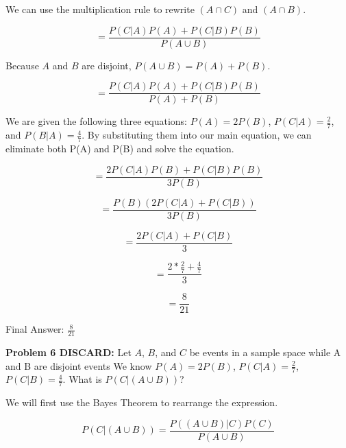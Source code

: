 \documentclass{article}
\begin{document}
 We can use the multiplication rule to rewrite $(A \cap C)$ and $(A \cap B)$.
 
 \begin{equation}
    = \frac{P(C|A)P(A) + P(C|B)P(B)}{P(A \cup B)}
 \end{equation}
 
 Because $A$ and $B$ are disjoint, $P(A \cup B) = P(A) + P(B)$.
 
 \begin{equation}
    = \frac{P(C|A)P(A) + P(C|B)P(B)}{P(A) + P(B)}
 \end{equation}
 
 We are given the following three equations: $P(A) = 2P(B)$, $P(C|A) = \frac{2}{7}$, and $P(B|A) = \frac{4}{7}$. By substituting them into our main equation, we can eliminate both P(A) and P(B) and solve the equation.
 
 \begin{equation}
    = \frac{2P(C|A)P(B) + P(C|B)P(B)}{3P(B)} 
 \end{equation}
 
 \begin{equation}
    = \frac{P(B)(2P(C|A) + P(C|B))}{3P(B)} 
 \end{equation}
 
 \begin{equation}
    = \frac{2P(C|A) + P(C|B)}{3}
 \end{equation}
 
 \begin{equation}
    = \frac{2*\frac{2}{7} + \frac{4}{7}}{3}
 \end{equation}
 
 \begin{equation}
    = \frac{8}{21}
 \end{equation}
 
 Final Answer: $\frac{8}{21}$\newline
 
 \newpage

 \begin{center}
     \Large\textbf{Problem 6 DISCARD:} Let $A$, $B$, and $C$ be events in a sample space while A and B are disjoint events We know $P(A) = 2P(B)$, $P(C|A) = \frac{2}{7}$, $P(C|B) = \frac{4}{7}$. What is $P(C|(A \cup B))$?\par
 \end{center}
 
 We will first use the Bayes Theorem to rearrange the expression.
 
 \begin{equation}
    P(C|(A \cup B)) = \frac{P((A \cup B) | C)P(C)}{P(A \cup B)}
 \end{equation}
 
\end{document}
